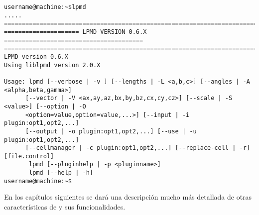 \begin{verbatim}
username@machine:~$lpmd
.....
================================================================================
===================== LPMD VERSION 0.6.X =======================================
================================================================================
LPMD version 0.6.X
Using liblpmd version 2.0.X

Usage: lpmd [--verbose | -v ] [--lengths | -L <a,b,c>] [--angles | -A <alpha,beta,gamma>]
      [--vector | -V <ax,ay,az,bx,by,bz,cx,cy,cz>] [--scale | -S <value>] [--option | -O
      <option=value,option=value,...>] [--input | -i plugin:opt1,opt2,...]  
      [--output | -o plugin:opt1,opt2,...] [--use | -u plugin:opt1,opt2,...] 
      [--cellmanager | -c plugin:opt1,opt2,...] [--replace-cell | -r] [file.control]
       lpmd [--pluginhelp | -p <pluginname>]
       lpmd [--help | -h]
username@machine:~$ 
\end{verbatim}

En los cap\'itulos siguientes se dar\'a una descripci\'on mucho m\'as detallada de otras caracter\'isticas de {\lpmd} y sus funcionalidades.
